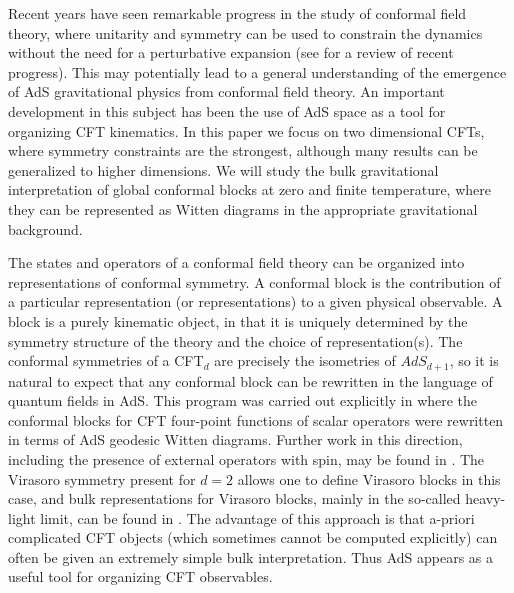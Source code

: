 \documentclass[12pt]{article}
\begin{document}
Recent years have seen remarkable progress in the study of conformal field theory, where unitarity and symmetry can be used to constrain the dynamics without the need for a perturbative expansion (see \cite{Rychkov:2016iqz,Poland:2016chs,Simmons-Duffin:2016gjk,Penedones:2016voo} for a review of recent progress).
This may potentially lead to a general understanding of the emergence of AdS gravitational physics from conformal field theory.
An important development in this subject has been the use of AdS space as a tool for organizing CFT kinematics.
In this paper we focus on two dimensional CFTs, where symmetry constraints are the strongest, although many results can be generalized to higher dimensions.
We will study the bulk gravitational interpretation of global conformal blocks at zero and finite temperature, where they can be represented as Witten diagrams in the appropriate gravitational background.

The states and operators of a conformal field theory can be organized into representations of conformal symmetry.
A conformal block is the contribution of a particular representation (or representations) to a given physical observable.  A block is a purely kinematic object, in that it is uniquely determined by the symmetry structure of the theory and the choice of representation(s).
The conformal symmetries of a CFT$_d$ are precisely the isometries of $AdS_{d+1}$, so it is natural to expect that any conformal block can be rewritten in the language of quantum fields in AdS.  This program was carried out explicitly in \cite{Hijano:2015zsa} where the conformal blocks for CFT four-point functions of scalar operators were rewritten in terms of AdS geodesic Witten diagrams.  Further work in this direction, including the presence of external operators with spin, may be found in \cite{Bhatta:2016hpz,Besken:2016ooo,Czech:2016xec,Nishida:2016vds,Castro:2017hpx,Dyer:2017zef,
Sleight:2017fpc,Chen:2017yia,Gubser:2017tsi}.  The Virasoro symmetry present for $d=2$ allows one to define Virasoro blocks in this case, and bulk representations for Virasoro blocks, mainly in the so-called heavy-light limit, can be found in \cite{Fitzpatrick:2014vua,Hijano:2015rla,Alkalaev:2015wia,Hijano:2015qja,Alkalaev:2015lca,Alkalaev:2015fbw,
Guica:2016pid,Alkalaev:2016rjl}.
The advantage of this approach is that a-priori complicated CFT objects (which sometimes cannot be computed explicitly) can often be given an extremely simple bulk interpretation.  Thus AdS appears as a useful tool for organizing CFT observables.
\end{document}
